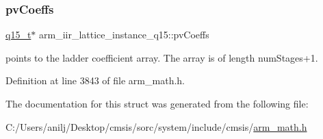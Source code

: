 \mbox{\label{structarm__iir__lattice__instance__q15_a4c4f57f45b223abbe2a9fb727bd2cad9}} 
\subsubsection{\texorpdfstring{pv\+Coeffs}{pvCoeffs}}
{\footnotesize\ttfamily \hyperlink{arm__math_8h_ab5a8fb21a5b3b983d5f54f31614052ea}{q15\+\_\+t}$\ast$ arm\+\_\+iir\+\_\+lattice\+\_\+instance\+\_\+q15\+::pv\+Coeffs}

points to the ladder coefficient array. The array is of length num\+Stages+1. 

Definition at line 3843 of file arm\+\_\+math.\+h.



The documentation for this struct was generated from the following file\+:\begin{DoxyCompactItemize}
\item 
C\+:/\+Users/anilj/\+Desktop/cmsis/sorc/system/include/cmsis/\hyperlink{arm__math_8h}{arm\+\_\+math.\+h}\end{DoxyCompactItemize}
